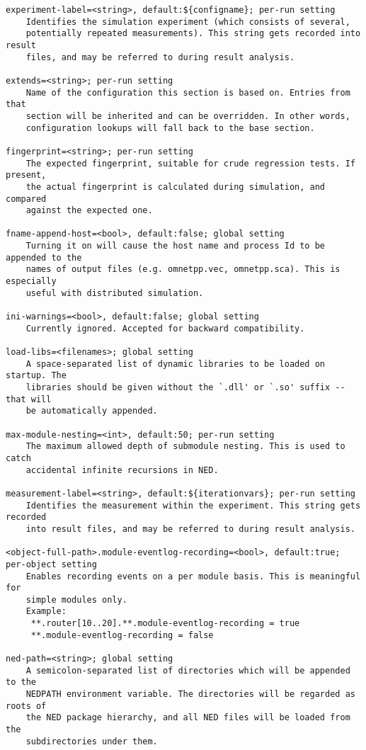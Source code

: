 \begin{verbatim}
experiment-label=<string>, default:${configname}; per-run setting
    Identifies the simulation experiment (which consists of several,
    potentially repeated measurements). This string gets recorded into result
    files, and may be referred to during result analysis.

extends=<string>; per-run setting
    Name of the configuration this section is based on. Entries from that
    section will be inherited and can be overridden. In other words,
    configuration lookups will fall back to the base section.

fingerprint=<string>; per-run setting
    The expected fingerprint, suitable for crude regression tests. If present,
    the actual fingerprint is calculated during simulation, and compared
    against the expected one.

fname-append-host=<bool>, default:false; global setting
    Turning it on will cause the host name and process Id to be appended to the
    names of output files (e.g. omnetpp.vec, omnetpp.sca). This is especially
    useful with distributed simulation.

ini-warnings=<bool>, default:false; global setting
    Currently ignored. Accepted for backward compatibility.

load-libs=<filenames>; global setting
    A space-separated list of dynamic libraries to be loaded on startup. The
    libraries should be given without the `.dll' or `.so' suffix -- that will
    be automatically appended.

max-module-nesting=<int>, default:50; per-run setting
    The maximum allowed depth of submodule nesting. This is used to catch
    accidental infinite recursions in NED.

measurement-label=<string>, default:${iterationvars}; per-run setting
    Identifies the measurement within the experiment. This string gets recorded
    into result files, and may be referred to during result analysis.

<object-full-path>.module-eventlog-recording=<bool>, default:true; per-object setting
    Enables recording events on a per module basis. This is meaningful for
    simple modules only.
    Example:
     **.router[10..20].**.module-eventlog-recording = true
     **.module-eventlog-recording = false

ned-path=<string>; global setting
    A semicolon-separated list of directories which will be appended to the
    NEDPATH environment variable. The directories will be regarded as roots of
    the NED package hierarchy, and all NED files will be loaded from the
    subdirectories under them.


\end{verbatim}
